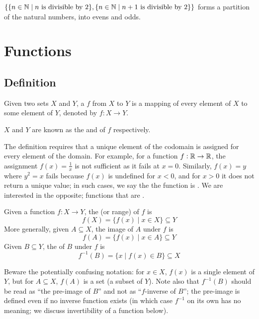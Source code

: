 \begin{example}
$\{\{n \in \mathbb N \mid n \text{ is divisible by } 2\}, \{n \in \mathbb N \mid n+1 \text{ is divisible by } 2\}\}$ forms a partition of the natural numbers, into evens and odds.
\end{example}
\pagebreak

\section{Functions}
\subsection{Definition}
\begin{definition}
Given two sets $X$ and $Y$, a  $f$ from $X$ to $Y$ is a mapping of every element of $X$ to some element of $Y$, denoted by $f:X\to Y$. 
\end{definition}

$X$ and $Y$ are known as the  and  of $f$ respectively.

\begin{remark}
The definition requires that a unique element of the codomain is assigned for every element of the domain. For example, for a function $f:\mathbb R \to \mathbb R$, the assignment $f(x)=\frac{1}{x}$ is not sufficient as it fails at $x=0$. Similarly, $f(x)=y$ where $y^2=x$ fails because $f(x)$ is undefined for $x<0$, and for $x>0$ it does not return a unique value; in such cases, we say the the function is . We are interested in the opposite; functions that are .
\end{remark}

\begin{definition}
Given a function $f:X \to Y$, the  (or range) of $f$ is
\[ f(X) = \{f(x) \mid x \in X\} \subseteq Y \]
More generally, given $A \subseteq X$, the image of $A$ under $f$ is
\[ f(A) = \{f(x) \mid x \in A\} \subseteq Y \]
Given $B \subseteq Y$, the  of $B$ under $f$ is
\[ f^{-1}(B) = \{x \mid f(x) \in B\} \subseteq X \]
\end{definition}

\begin{remark}
Beware the potentially confusing notation: for $x \in X$, $f(x)$ is a single element of $Y$, but for $A \subseteq X$, $f(A)$ is a set (a subset of $Y$). Note also that $f^{-1}(B)$ should be read as ``the pre-image of $B$'' and not as ``$f$-inverse of $B$''; the pre-image is defined even if no inverse function exists (in which case $f^{-1}$ on its own has no meaning; we discuss invertibility of a function below).
\end{remark}

